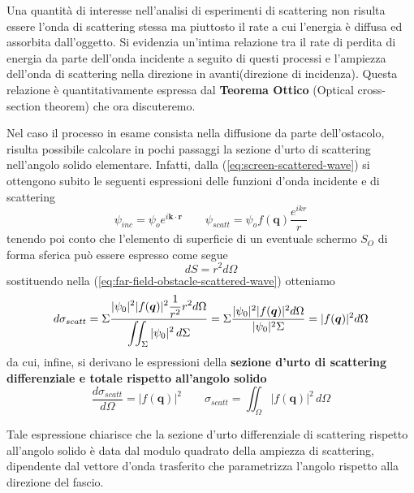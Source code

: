 %
\bigbreak
Una quantità di interesse nell'analisi di esperimenti di scattering non risulta essere l'onda di scattering stessa ma
piuttosto il rate a cui l'energia è diffusa ed assorbita dall'oggetto.
Si evidenzia un'intima relazione tra il rate di perdita di energia da parte dell'onda incidente a seguito di questi processi
e l'ampiezza dell'onda di scattering nella direzione in avanti(direzione di incidenza).
Questa relazione è quantitativamente espressa dal \textbf{Teorema Ottico} (Optical cross-section theorem) che ora discuteremo.

Nel caso il processo in esame consista nella diffusione da parte dell'ostacolo, risulta possibile calcolare in pochi passaggi la sezione d'urto di scattering nell'angolo solido elementare.
Infatti, dalla (\ref{eq:screen-scattered-wave}) si ottengono subito le seguenti espressioni delle funzioni d'onda incidente e di scattering
\[
	\psi_{inc} = \psi_o e^{i \bm{k} \cdot \bm{r}} \qquad
	\psi_{scatt} = \psi_o f(\bm{q})\frac{e^{ikr}}{r}
\] tenendo poi conto che l'elemento di superficie di un eventuale schermo $S_O$ di forma sferica può essere espresso come segue \[
																																	dS = r^2 d \Omega
\] sostituendo nella (\ref{eq:far-field-obstacle-scattered-wave}) otteniamo
\[
	d \sigma_{scatt} = \Sigma \fraclarg{|\psi_0|^2|f(\bm{q})|^2\frac{1}{r^2}r^2 d \Omega}{\iint_{\Sigma}|\psi_0|^2 \, d \Sigma}
	= \Sigma \frac{|\psi_0|^2|f(\bm{q})|^2 d \Omega}{|\psi_0|^2 \Sigma}
	= |f(\bm{q})|^2 d \Omega
\]
da cui, infine, si derivano le espressioni della \textbf{sezione d'urto di scattering differenziale e totale rispetto all'angolo solido}
\begin{equation}
	\frac{d \sigma_{scatt}}{d \Omega} = |f(\bm{q})|^2 \qquad
	\sigma_{scatt} = \iint_{\Omega}|f(\bm{q})|^2 \, d \Omega
	\label{eq:scattering-cross-section-solid-angle}
\end{equation}

Tale espressione chiarisce che la sezione d'urto differenziale di scattering rispetto all'angolo solido è data dal
modulo quadrato della ampiezza di scattering, dipendente dal vettore d'onda trasferito che parametrizza l'angolo
rispetto alla direzione del fascio.


